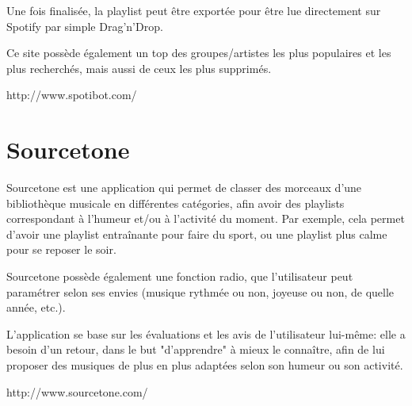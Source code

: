 Une fois finalisée, la playlist peut être exportée pour être lue directement 
sur Spotify par simple Drag'n'Drop.

Ce site possède également un top des groupes/artistes les plus populaires et 
les plus recherchés, mais aussi de ceux les plus supprimés.

http://www.spotibot.com/

\section{Sourcetone}
\label{existant:sourcetone}

Sourcetone est une application qui permet de classer des morceaux d'une 
bibliothèque musicale en différentes catégories, afin avoir des playlists 
correspondant à l'humeur et/ou à l'activité du moment. Par exemple, cela 
permet d'avoir une playlist entraînante pour faire du sport, ou une playlist 
plus calme pour se reposer le soir.

Sourcetone possède également une fonction radio, que l'utilisateur peut 
paramétrer selon ses envies (musique rythmée ou non, joyeuse ou non, de 
quelle année, etc.).

L'application se base sur les évaluations et les avis de l'utilisateur 
lui-même: elle a besoin d'un retour, dans le but "d'apprendre" à mieux le 
connaître, afin de lui proposer des musiques de plus en plus adaptées selon 
son humeur ou son activité.

http://www.sourcetone.com/